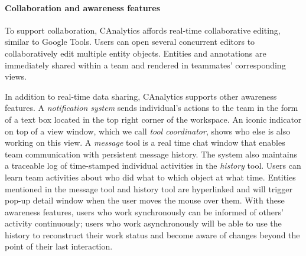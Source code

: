 \paragraph{Collaboration and awareness features}

To support collaboration, CAnalytics affords real-time collaborative editing, similar to 
Google Tools. Users can open several concurrent editors to
collaboratively edit multiple entity objects. Entities and annotations are immediately
shared within a team and rendered in teammates' corresponding views.

In addition to real-time data sharing, CAnalytics supports other awareness features. A \emph{notification system} sends
individual's actions to the team in the form of a text box located in the top
right corner of the workspace. An iconic
indicator on top of a view window, which we call \emph{tool coordinator}, shows who else is also working on this view. A \emph{message} tool is a real time chat window that enables team
communication with persistent message history. The system also maintains
a traceable log of time-stamped individual activities in the \emph{history} tool.
Users can learn team activities about who did what to which object at
what time. Entities mentioned in the message tool and
history tool are hyperlinked and will trigger pop-up detail window when
the user moves the mouse over them. With these awareness features, users who work
synchronously can be informed of others' activity continuously; users
who work asynchronously will be able to use the history to reconstruct
their work status and become aware of changes beyond the point of their
last interaction.
